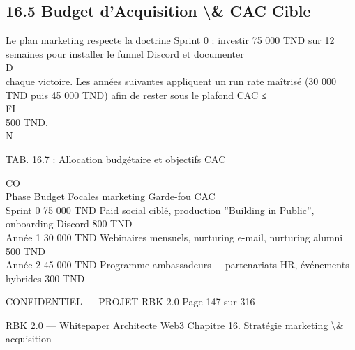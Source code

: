\documentclass[12pt,landscape,a4paper]{article}
\newenvironment{confidential}
{\begin{tcolorbox}[
    colback=rbkred!5!white,
    colframe=rbkred!75!black,
    title=CONFIDENTIEL,
    fonttitle=\bfseries\color{white},
    coltitle=rbkred!75!black,
    breakable,
    enhanced,
    frame hidden,
    borderline west={2pt}{0pt}{rbkred!75!black}
]}
{\end{tcolorbox}}
\begin{document}
\subsection{16.5 Budget d’Acquisition \textbackslash{}& CAC Cible}
Le plan marketing respecte la doctrine Sprint 0 : investir 75 000 TND sur 12 semaines pour installer le funnel Discord et documenter\\
\vspace{0.5em}
\vspace{0.5em}
\vspace{0.5em}
\vspace{0.5em}
D\\
chaque victoire. Les années suivantes appliquent un run rate maîtrisé (30 000 TND puis 45 000 TND) afin de rester sous le plafond CAC ≤\\
\vspace{0.5em}
\vspace{0.5em}
\vspace{0.5em}
\vspace{0.5em}
FI\\
500 TND.\\
\vspace{0.5em}
N\\
\begin{center}\begin{tabular}TAB. 16.7 : Allocation budgétaire et objectifs CAC\end{tabular}\end{center}
CO\\
Phase Budget        Focales marketing                                                      Garde-fou CAC\\
Sprint 0 75 000 TND Paid social ciblé, production ”Building in Public”, onboarding Discord 800 TND\\
Année 1 30 000 TND Webinaires mensuels, nurturing e-mail, nurturing alumni                 500 TND\\
Année 2 45 000 TND Programme ambassadeurs + partenariats HR, événements hybrides           300 TND\\
\vspace{0.5em}
\vspace{0.5em}
\vspace{0.5em}
\vspace{0.5em}
\begin{confidential}CONFIDENTIEL — PROJET RBK 2.0                                Page 147 sur 316\end{confidential}
RBK 2.0 — Whitepaper Architecte Web3                                                           Chapitre 16. Stratégie marketing \textbackslash{}& acquisition\\
\end{document}
